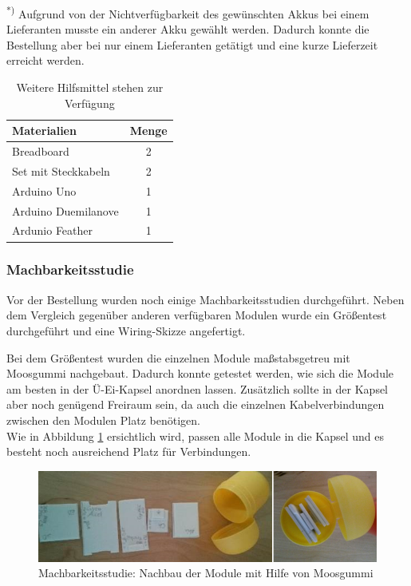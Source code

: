 \textsuperscript{*)} Aufgrund von der Nichtverfügbarkeit des gewünschten Akkus bei einem Lieferanten musste ein anderer Akku gewählt werden. Dadurch konnte die Bestellung aber bei nur einem Lieferanten getätigt und eine kurze Lieferzeit erreicht werden.

\begin{table}[h]
	\centering
	\begin{tabular}{|l|c|}
		\hline
		\textbf{Materialien} & \textbf{Menge} \\
		\hline
		Breadboard & 2 \\
		\hline
		Set mit Steckkabeln & 2 \\
		\hline
		Arduino Uno & 1 \\
		\hline	
		Arduino Duemilanove & 1 \\
		\hline	
		Ardunio Feather & 1\\
		\hline
	\end{tabular}
	\caption{Weitere Hilfsmittel stehen zur Verfügung}
	\label{tab:verfuegbareHW}
\end{table}

\subsubsection{Machbarkeitsstudie}

Vor der Bestellung wurden noch einige Machbarkeitsstudien durchgeführt. Neben dem Vergleich gegenüber anderen verfügbaren Modulen wurde ein Größentest durchgeführt und eine Wiring-Skizze angefertigt.

Bei dem Größentest wurden die einzelnen Module maßstabsgetreu mit Moosgummi nachgebaut. Dadurch konnte getestet werden, wie sich die Module am besten in der Ü-Ei-Kapsel anordnen lassen. Zusätzlich sollte in der Kapsel aber noch genügend Freiraum sein, da auch die einzelnen Kabelverbindungen zwischen den Modulen Platz benötigen.  \\
Wie in Abbildung \ref{fig:k3_machbarkeitsstudie} ersichtlich wird, passen alle Module in die Kapsel und es besteht noch ausreichend Platz für Verbindungen.

\begin{figure}[ht]
	\centering
	\includegraphics[width=1\textwidth]{images/k3-machbarkeitsstudie.PNG}
	\caption {Machbarkeitsstudie: Nachbau der Module mit Hilfe von Moosgummi}
	\label{fig:k3_machbarkeitsstudie}
\end{figure}

